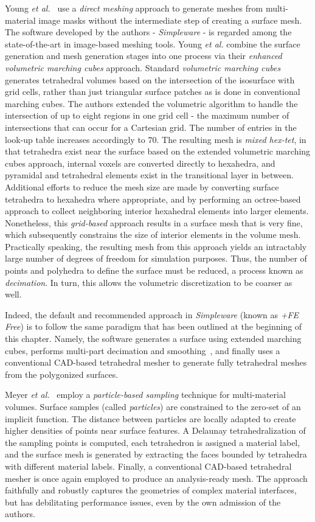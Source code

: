 Young \textit{et al.}~\cite{young_2008} use a \textit{direct meshing} approach to generate meshes from multi-material image masks without the intermediate step of creating a surface mesh. The software developed by the authors - \textit{Simpleware} - is regarded among the state-of-the-art in image-based meshing tools. Young \textit{et al.} combine the surface generation and mesh generation stages into one process via their \textit{enhanced volumetric marching cubes} approach. Standard \textit{volumetric marching cubes} generates tetrahedral volumes based on the intersection of the isosurface with grid cells, rather than just triangular surface patches as is done in conventional marching cubes. The authors extended the volumetric algorithm to handle the intersection of up to eight regions in one grid cell - the maximum number of intersections that can occur for a Cartesian grid. The number of entries in the look-up table increases accordingly to 70. The resulting mesh is \textit{mixed hex-tet}, in that tetrahedra exist near the surface based on the extended volumetric marching cubes approach, internal voxels are converted directly to hexahedra, and pyramidal and tetrahedral elements exist in the transitional layer in between. Additional efforts to reduce the mesh size are made by converting surface tetrahedra to hexahedra where appropriate, and by performing an octree-based approach to collect neighboring interior hexahedral elements into larger elements. Nonetheless, this \textit{grid-based} approach results in a surface mesh that is very fine, which subsequently constrains the size of interior elements in the volume mesh. Practically speaking, the resulting mesh from this approach yields an intractably large number of degrees of freedom for simulation purposes. Thus, the number of points and polyhedra to define the surface must be reduced, a process known as \textit{decimation}. In turn, this allows the volumetric discretization to be coarser as well.

Indeed, the default and recommended approach in \textit{Simpleware} (known as \textit{+FE Free}) is to follow the same paradigm that has been outlined at the beginning of this chapter. Namely, the software generates a surface using extended marching cubes, performs multi-part decimation and smoothing~\cite{egst}, and finally uses a conventional CAD-based tetrahedral mesher to generate fully tetrahedral meshes from the polygonized surfaces.

Meyer \textit{et al.}~\cite{meyer_2008} employ a \textit{particle-based sampling} technique for multi-material volumes. Surface samples (called \textit{particles}) are constrained to the zero-set of an implicit function. The distance between particles are locally adapted to create higher densities of points near surface features. A Delaunay tetrahedralization of the sampling points is computed, each tetrahedron is assigned a material label, and the surface mesh is generated by extracting the faces bounded by tetrahedra with different material labels. Finally, a conventional CAD-based tetrahedral mesher is once again employed to produce an analysis-ready mesh. The approach faithfully and robustly captures the geometries of complex material interfaces, but has debilitating performance issues, even by the own admission of the authors.


